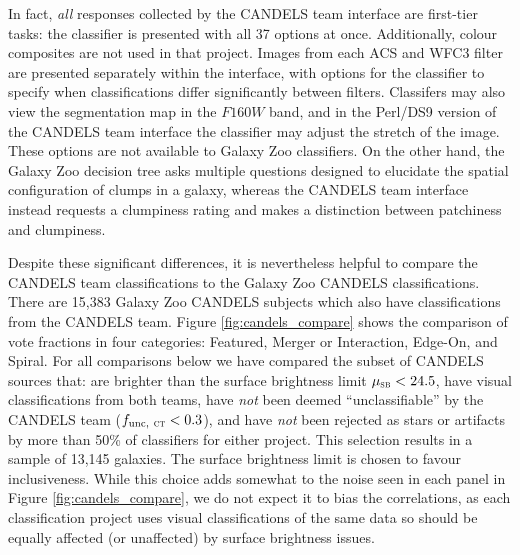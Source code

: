 \documentclass[useAMS,usenatbib]{mn2e}
\def\mmusb     {\mu_{\rm{\textsc{sb}}}}
\begin{document}
{In fact, \emph{all} responses collected by the CANDELS team interface are first-tier tasks: the classifier is presented with all 37 options at once. Additionally, colour composites are not used in that project. Images from each ACS and WFC3 filter are presented separately within the interface, with options for the classifier to specify when classifications differ significantly between filters. Classifers may also view the segmentation map in the $F160W$ band, and in the Perl/DS9 version of the CANDELS team interface the classifier may adjust the stretch of the image. These options are not available to Galaxy Zoo classifiers. On the other hand, the Galaxy Zoo decision tree asks multiple questions designed to elucidate the spatial configuration of clumps in a galaxy, whereas the CANDELS team interface instead requests a clumpiness rating and makes a distinction between patchiness and clumpiness. 

Despite these significant differences, it is nevertheless helpful to compare the CANDELS team classifications to the Galaxy Zoo CANDELS classifications. There are 15,383 Galaxy Zoo CANDELS subjects which also have classifications from the CANDELS team. Figure \ref{fig:candels_compare} shows the comparison of vote fractions in four categories: Featured, Merger or Interaction, Edge-On, and Spiral. For all comparisons below we have compared the subset of CANDELS sources that: are brighter than the surface brightness limit $\mmusb < 24.5$, have visual classifications from both teams, have \emph{not} been deemed ``unclassifiable'' by the CANDELS team ($f_{\rm unc,~\textsc{ct}} < 0.3$), and have \emph{not} been rejected as stars or artifacts by more than 50\% of classifiers for either project. This selection results in a sample of 13,145 galaxies. The surface brightness limit is chosen to favour inclusiveness. While this choice adds somewhat to the noise seen in each panel in Figure \ref{fig:candels_compare}, we do not expect it to bias the correlations, as each classification project uses visual classifications of the same data so should be equally affected (or unaffected) by surface brightness issues.
  
}
\end{document}
